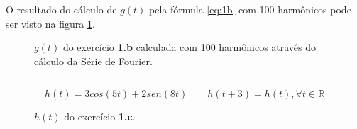 O resultado do cálculo de $g(t)$ pela fórmula \eqref{eq:1b} com 100 harmônicos pode ser visto na figura \ref{fig:1b-gfs}.

\begin{figure}
  \caption{\small{$g(t)$ do exercício \textbf{1.b} calculada com 100 harmônicos através do cálculo da Série de Fourier.}}
  \label{fig:1b-gfs}
\end{figure}


\subsection{}

\[\displaystyle
h(t) = 3cos(5t)+2sen(8t) \quad \quad h(t+3) = h(t), \forall t \in \mathbb{R}
\]

\begin{figure}
  \caption{\small{$h(t)$ do exercício \textbf{1.c}.}}
  \label{fig:1c-h}
\end{figure}


